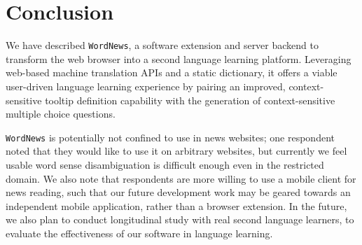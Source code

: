 \section{Conclusion}
\label{sec:conclusion}

We have described {\tt WordNews}, a software extension and server
backend to transform the web browser into a second language learning
platform.  Leveraging web-based machine translation APIs and a static
dictionary, it offers a viable user-driven language learning
experience by pairing an improved, context-sensitive tooltip
definition capability with the generation of context-sensitive
multiple choice questions.


{\tt WordNews} is potentially not confined to use in news websites; one
respondent noted that they would like to use it on arbitrary websites,
but currently we feel usable word sense disambiguation is difficult
enough even in the restricted domain.  We also note that respondents
are more willing to use a mobile client for news reading, such that
our future development work may be geared towards an independent
mobile application, rather than a browser extension. In the future, we also plan to conduct longitudinal study with real second language learners, to evaluate the effectiveness of our software in language learning.

